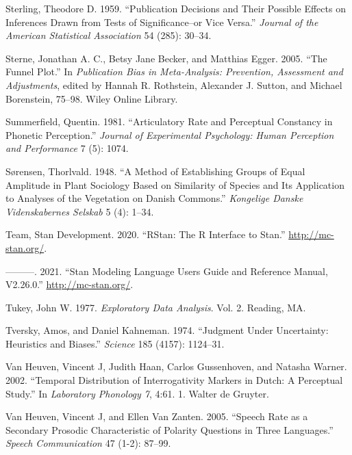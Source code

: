 \documentclass[
  12pt,
]{article}
\newlength{\cslhangindent}
\newenvironment{CSLReferences}[2] %
 {%
  \setlength{\parindent}{0pt}
  \ifodd #1 \everypar{\setlength{\hangindent}{\cslhangindent}}\ignorespaces\fi
  \ifnum #2 > 0
  \setlength{\parskip}{#2\baselineskip}
  \fi
 }%
 {}
\begin{document}
\begin{CSLReferences}{1}{0}
\leavevmode{}%
Sterling, Theodore D. 1959. {``Publication Decisions and Their Possible Effects on Inferences Drawn from Tests of Significance--or Vice Versa.''} \emph{Journal of the American Statistical Association} 54 (285): 30--34.

\leavevmode{}%
Sterne, Jonathan A. C., Betsy Jane Becker, and Matthias Egger. 2005. {``The Funnel Plot.''} In \emph{Publication Bias in Meta-Analysis: Prevention, Assessment and Adjustments}, edited by Hannah R. Rothstein, Alexander J. Sutton, and Michael Borenstein, 75--98. Wiley Online Library.

\leavevmode{}%
Summerfield, Quentin. 1981. {``Articulatory Rate and Perceptual Constancy in Phonetic Perception.''} \emph{Journal of Experimental Psychology: Human Perception and Performance} 7 (5): 1074.

\leavevmode{}%
Sørensen, Thorlvald. 1948. {``A Method of Establishing Groups of Equal Amplitude in Plant Sociology Based on Similarity of Species and Its Application to Analyses of the Vegetation on {D}anish Commons.''} \emph{Kongelige Danske Videnskabernes Selskab} 5 (4): 1--34.

\leavevmode{}%
Team, Stan Development. 2020. {``{RStan}: The {R} Interface to {Stan}.''} \url{http://mc-stan.org/}.

\leavevmode{}%
---------. 2021. {``Stan Modeling Language Users Guide and Reference Manual, V2.26.0.''} \url{http://mc-stan.org/}.

\leavevmode{}%
Tukey, John W. 1977. \emph{Exploratory Data Analysis}. Vol. 2. Reading, MA.

\leavevmode{}%
Tversky, Amos, and Daniel Kahneman. 1974. {``Judgment Under Uncertainty: Heuristics and Biases.''} \emph{Science} 185 (4157): 1124--31.

\leavevmode{}%
Van Heuven, Vincent J, Judith Haan, Carlos Gussenhoven, and Natasha Warner. 2002. {``Temporal Distribution of Interrogativity Markers in {D}utch: A Perceptual Study.''} In \emph{Laboratory Phonology 7}, 4:61. 1. Walter de Gruyter.

\leavevmode{}%
Van Heuven, Vincent J, and Ellen Van Zanten. 2005. {``Speech Rate as a Secondary Prosodic Characteristic of Polarity Questions in Three Languages.''} \emph{Speech Communication} 47 (1-2): 87--99.


\end{CSLReferences}
\end{document}
